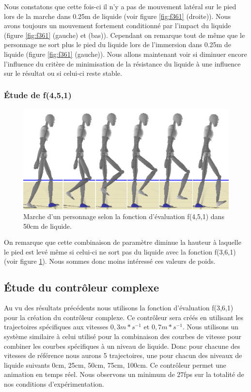 \documentclass[runningheads,a4paper]{llncs}
\begin{document}
Nous constatons que cette fois-ci il n'y a pas de mouvement latéral sur le pied lors de la marche dans 0.25m de liquide (voir figure \ref{fig:f361} (droite)). Nous avons toujours un mouvement fortement conditionné par l'impact du liquide (figure \ref{fig:f361} (gauche) et (bas)). Cependant on remarque tout de même que le personnage ne sort plus le pied du liquide lors de l'immersion dans 0.25m de liquide (figure \ref{fig:f361} (gauche)). Nous allons maintenant voir si diminuer encore l'influence du critère de minimisation de la résistance du liquide à une influence sur le résultat ou si celui-ci reste stable.

\subsubsection{Étude de f(4,5,1)}
\begin{figure}[h]
\centering
\includegraphics[scale=0.4]{strips/4_5_1_50cm.png}
\caption{Marche d'un personnage selon la fonction d'évaluation f(4,5,1) dans 50cm de liquide.}
\label{fig:f451}
\end{figure}

On remarque que cette combinaison de paramètre diminue la hauteur à laquelle le pied est levé même si celui-ci ne sort pas du liquide avec la fonction f(3,6,1) (voir figure \ref{fig:f451}). Nous sommes donc moins intéressé ces valeurs de poids. 

\subsection{Étude du contrôleur complexe}

Au vu des résultats précédents nous utilisons la fonction d'évaluation f(3,6,1) pour la création du contrôleur complexe. Ce contrôleur sera créés en utilisant les trajectoires spécifiques aux vitesses $0,3m*s^{-1}$ et $0,7m*s^{-1}$. Nous utilisons un système similaire à celui utilisé pour la combinaison des courbes de vitesse pour combiner les courbes spécifiques à un niveau de liquide. Donc pour chacune des vitesses de référence nous aurons 5 trajectoires, une pour chacun des niveaux de liquide suivants 0cm, 25cm, 50cm, 75cm, 100cm. Ce contrôleur permet une animation en temps réel. Nous observons un minimum de 27fps sur la totalité de nos conditions d'expérimentation.
\end{document}
